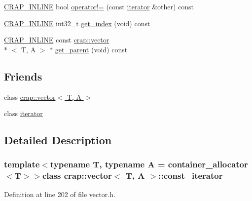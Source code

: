 \begin{DoxyCompactItemize}
\hyperlink{config__x86_8h_a5a40526b8d842e7ff731509998bb0f1c}{C\+R\+A\+P\+\_\+\+I\+N\+L\+I\+N\+E} bool \hyperlink{classcrap_1_1vector_1_1const__iterator_aac2f9e369e0b8366dd251645dcd30f6a}{operator!=} (const \hyperlink{classcrap_1_1vector_1_1iterator}{iterator} \&other) const 
\item 
\hyperlink{config__x86_8h_a5a40526b8d842e7ff731509998bb0f1c}{C\+R\+A\+P\+\_\+\+I\+N\+L\+I\+N\+E} int32\+\_\+t \hyperlink{classcrap_1_1vector_1_1const__iterator_aa3f481476ef9658526e6384f60af4c13}{get\+\_\+index} (void) const 
\item 
\hyperlink{config__x86_8h_a5a40526b8d842e7ff731509998bb0f1c}{C\+R\+A\+P\+\_\+\+I\+N\+L\+I\+N\+E} const \hyperlink{classcrap_1_1vector}{crap\+::vector}\\*
$<$ T, A $>$ $\ast$ \hyperlink{classcrap_1_1vector_1_1const__iterator_a40b8389dcf003e243f4e0c6884c500c6}{get\+\_\+parent} (void) const 
\end{DoxyCompactItemize}
\subsection*{Friends}
\begin{DoxyCompactItemize}
\item 
class \hyperlink{classcrap_1_1vector_1_1const__iterator_ad6b7070de08891c8bdaba9bce10c2220}{crap\+::vector$<$ T, A $>$}
\item 
class \hyperlink{classcrap_1_1vector_1_1const__iterator_a67171474c4da6cc8efe0c7fafefd2b2d}{iterator}
\end{DoxyCompactItemize}


\subsection{Detailed Description}
\subsubsection*{template$<$typename T, typename A = container\+\_\+allocator$<$\+T$>$$>$class crap\+::vector$<$ T, A $>$\+::const\+\_\+iterator}



Definition at line 202 of file vector.\+h.



